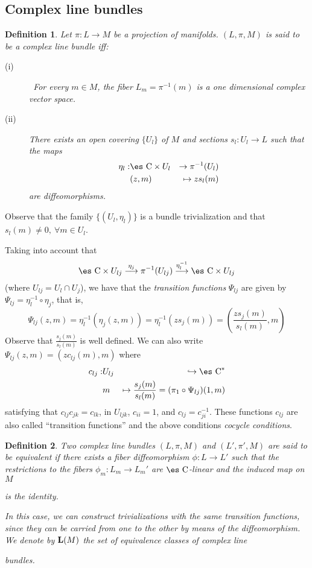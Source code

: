 \documentclass[12pt]{article}
\theoremstyle{plain}
\newtheorem{definition}{Definition}
\def\beann{\begin{eqnarray*}}
\def\eeann{\end{eqnarray*}}
\def\mapping#1{\mathrel{\mathop{\longrightarrow}\limits^{#1}}}
\def\Complex{\mbox{\es C}}
\begin{document}
\subsection{Complex line bundles}


\begin{definition}
Let $\pi :L \to M$ be a projection of manifolds.
$(L,\pi ,M)$ is said to be a {\rm complex line bundle} iff:
\begin{description}
\item[{\rm (i)}] \
For every $m \in M$, the fiber $L_m = \pi^{-1}(m)$
is a one dimensional complex vector space.
\item[{\rm (ii)}]
There exists an open covering $\{ U_l \}$ of $M$
and sections $s_l:U_l \to L$ such that the maps
\beann
\eta_l : & \Complex \times U_l & \to  \pi^{-1}(U_l)
\\
& (z,m) & \mapsto zs_l(m)
\eeann
are diffeomorphisms.
\end{description}
\label{clb}
\end{definition}

Observe that the family $\{ (U_l,\eta_l) \}$
is a bundle trivialization and that $s_l(m) \not= 0, \ \forall m \in
U_l$.

Taking into account that
$$
\Complex \times U_{l j} \mapping{\eta_j}
\pi^{-1}(U_{l j}) \mapping{\eta_l^{-1}} \Complex \times U_{l j}
$$
(where $U_{l j}=U_l \cap U_j$), we have that the {\it transition
functions}
$\Psi_{l j}$ are given by $\Psi_{l j} = \eta_l^{-1} \circ \eta_j$, that
is,
$$
\Psi_{l j}(z,m) = \eta_l^{-1}(\eta_j(z,m)) =
\eta_l^{-1}(zs_j(m)) =
\left(\frac {zs_j(m)}{s_l(m)},m\right)
$$
Observe that $\frac{s_j(m)}{s_l(m)}$ is well defined.
We can also write $\Psi_{l j}(z,m) =(zc_{l j}(m),m)$ where
\beann
c_{l j} : & U_{l j} & \hookrightarrow \Complex^*
\\
& m & \mapsto \frac{s_j(m)}{s_l(m)} = (\pi_1 \circ \Psi_{l j})(1,m)
\eeann
satisfying that $c_{l j}c_{jk} = c_{l k}$, in $U_{l jk}$,
$c_{ii} = 1$, and $c_{l j} = c_{ji}^{-1}$.
These functions $c_{l j}$ are also called ``transition functions''
and the above conditions {\it cocycle conditions}.

\begin{definition}
Two complex line bundles $(L,\pi ,M)$ and $(L',\pi ',M)$
are said to be {\rm equivalent} if there exists a fiber diffeomorphism
$\phi : L \to L'$ such that the restrictions to the fibers
$\phi_m : L_m \to L_m'$ are $\Complex$-linear and the induced map on $M$

is the identity.

In this case, we can construct trivializations with the same
transition functions, since they can be carried from one to the other
by means of the diffeomorphism.
We denote by ${\bf L}(M)$ the set of equivalence classes of complex line

bundles.
\label{clbe}
\end{definition}
\end{document}
